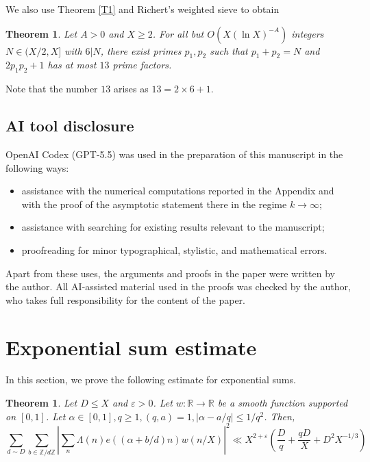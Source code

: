 \documentclass[10pt,a4paper]{amsart}
\newtheorem{thm}[dfn]{Theorem}
\newcommand{\1}{
    \bm{1}
}
\newcommand{\aZ}[1]{
\mathbb{Z}/{ #1 \mathbb{Z}}
}
\begin{document}
We also use Theorem \ref{T1} and Richert's weighted sieve to obtain
\begin{thm}\label{T3}
Let $A>0$ and $X \geq 2$. 
For all but $O(X(\ln{X})^{-A})$ integers $N \in (X/2,X]$ with $6|N$, there exist primes $p_1,p_2$ such that $p_1+p_2=N$ and $2p_1p_2+1$ has at most $13$ prime factors. 
\end{thm}
Note that the number $13$ arises as $13=2 \times 6 + 1$.






\subsection{AI tool disclosure}


OpenAI Codex (GPT-5.5) was used in the preparation of this manuscript in the following ways:
\begin{itemize}
\item assistance with the numerical computations reported in the Appendix and with the proof of the asymptotic statement there in the regime \(k\to\infty\);
\item assistance with searching for existing results relevant to the manuscript;
\item proofreading for minor typographical, stylistic, and mathematical errors.
\end{itemize}
Apart from these uses, the arguments and proofs in the paper were written by the author.  All AI-assisted material used in the proofs was checked by the author, who takes full responsibility for the content of the paper.


\section{Exponential sum estimate}


In this section, we prove the following estimate for exponential sums. 


\begin{thm}\label{Lmb}
Let $D \leq X$ and $\varepsilon>0$. 
Let $w:\mathbb{R} \to \mathbb{R}$ be a smooth function supported on $[0,1]$. 
Let $\alpha \in [0,1], q \geq 1, (q,a)=1, |\alpha-a/q| \leq 1/q^2$. Then,
\begin{equation} \sum_{d \sim D} \sum_{b \in \aZ{d}} \left| \sum_{n} \Lambda(n) e((\alpha+b/d)n) w(n/X) \right|^2 \ll X^{2+\varepsilon} \left( \frac{D}{q} + \frac{qD}{X} + D^2 X^{-1/3} \right) \label{EXP} \end{equation}
\end{thm}
\end{document}
